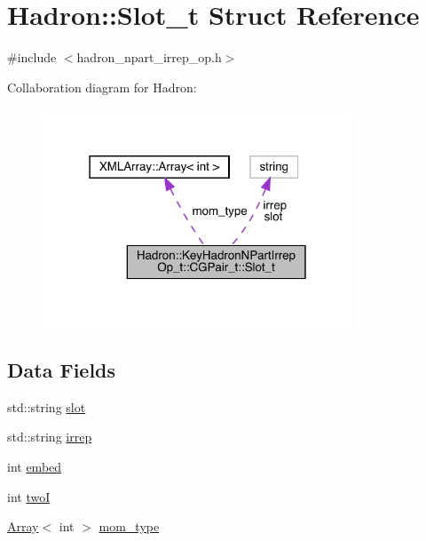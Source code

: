 \hypertarget{structHadron_1_1KeyHadronNPartIrrepOp__t_1_1CGPair__t_1_1Slot__t}{}\section{Hadron\+:\+:Slot\+\_\+t Struct Reference}
\label{structHadron_1_1KeyHadronNPartIrrepOp__t_1_1CGPair__t_1_1Slot__t}


{\ttfamily \#include $<$hadron\+\_\+npart\+\_\+irrep\+\_\+op.\+h$>$}



Collaboration diagram for Hadron\+:\nopagebreak
\begin{figure}[H]
\begin{center}
\leavevmode
\includegraphics[width=262pt]{d9/d4b/structHadron_1_1KeyHadronNPartIrrepOp__t_1_1CGPair__t_1_1Slot__t__coll__graph}
\end{center}
\end{figure}
\subsection*{Data Fields}
\begin{DoxyCompactItemize}
\item 
std\+::string \mbox{\hyperlink{structHadron_1_1KeyHadronNPartIrrepOp__t_1_1CGPair__t_1_1Slot__t_a48786cd4ae0529fc0b55e99893257007}{slot}}
\item 
std\+::string \mbox{\hyperlink{structHadron_1_1KeyHadronNPartIrrepOp__t_1_1CGPair__t_1_1Slot__t_a0fa5d415d4e26b91b78c06427277c5f7}{irrep}}
\item 
int \mbox{\hyperlink{structHadron_1_1KeyHadronNPartIrrepOp__t_1_1CGPair__t_1_1Slot__t_a67dd586571d9d54464c51fad723b36d0}{embed}}
\item 
int \mbox{\hyperlink{structHadron_1_1KeyHadronNPartIrrepOp__t_1_1CGPair__t_1_1Slot__t_a8586d34f626ec15fbebf2b18c82a9184}{twoI}}
\item 
\mbox{\hyperlink{classXMLArray_1_1Array}{Array}}$<$ int $>$ \mbox{\hyperlink{structHadron_1_1KeyHadronNPartIrrepOp__t_1_1CGPair__t_1_1Slot__t_a79e12c52b5e57439cf963cd24eeb7903}{mom\+\_\+type}}
\end{DoxyCompactItemize}


